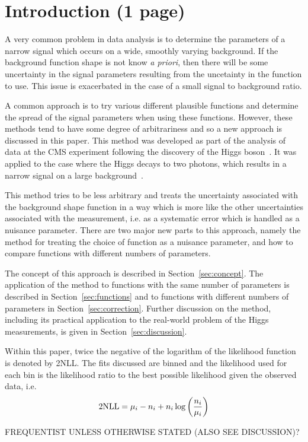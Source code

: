 \section{Introduction (1 page)}
\label{sec:introduction}

A very common problem in data analysis is to determine the parameters of
a narrow signal which occurs on a wide, smoothly varying background. If the
background function shape is not know {\it a priori}, then there will be 
some uncertainty in the signal parameters resulting from the uncetainty in
the function to use. This issue is exacerbated in the case of a small signal to
background ratio.

A common approach is to try various different plausible functions and 
determine the spread of the signal parameters when using these functions.
However, these methods tend to have some degree of arbitrariness and so
a new approach is discussed in this paper.
This method was developed as part of the analysis of data at the CMS experiment
following the discovery of the Higgs
boson~\cite{ref:introduction:higgs}.
It was applied to the case where the Higgs decays to two photons, which
results in a narrow signal on a large 
background~\cite{ref:introduction:legacy}.

This method tries to be less 
arbitrary and treats the uncertainty associated with the
background shape function in a way
which is more like the other
uncertainties associated with the measurement, i.e. as a systematic error
which is handled as a nuisance parameter.
There are two major new parts to this approach, namely the method for
treating the choice of function as a nuisance parameter, and how to compare 
functions with different numbers of parameters.


The concept of this approach is described in Section~\ref{sec:concept}.
The application of the method to functions with the same number of parameters
is described in Section~\ref{sec:functions} and to functions with different
numbers of parameters in Section~\ref{sec:correction}. Further discussion on
the method, including its practical application to the real-world problem of
the Higgs measurements, is given in Section~\ref{sec:discussion}.

Within this paper, twice the negative of the logarithm of the likelihood
function is denoted by 2NLL. The fits discussed are binned and the 
likelihood used for each bin is the likelihood ratio to the best
possible likelihood given the observed data, i.e.
\begin{equation}
{\rm 2NLL} = \mu_i - n_i + n_i \log\left(\frac{n_i}{\mu_i}\right)
\label{eqn:introduction:def2NLL}
\end{equation}

FREQUENTIST UNLESS OTHERWISE STATED (ALSO SEE DISCUSSION)?
